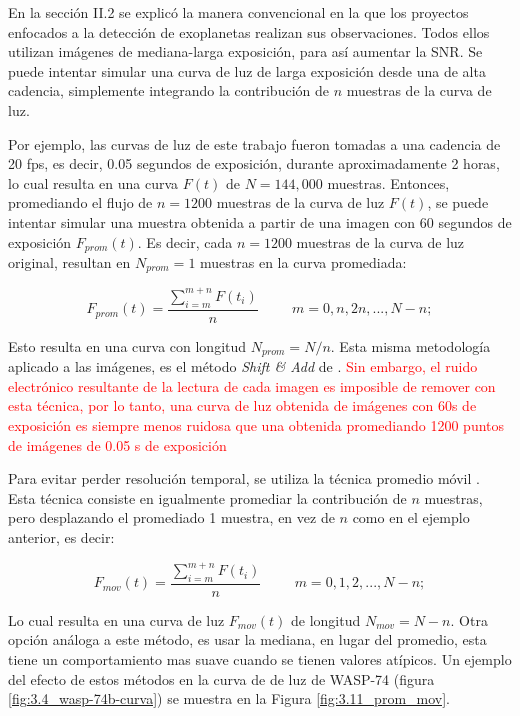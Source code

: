 En la sección II.2 se explicó la manera convencional en la que los proyectos enfocados a la detección de exoplanetas realizan sus observaciones. Todos ellos utilizan imágenes de mediana-larga exposición, para así aumentar la SNR. Se puede intentar simular una curva de luz de larga exposición desde una de alta cadencia, simplemente integrando la contribución de $n$ muestras de la curva de luz. 

Por ejemplo, las curvas de luz de este trabajo fueron tomadas a una cadencia de 20 fps, es decir, 0.05 segundos de exposición, durante aproximadamente 2 horas, lo cual resulta en una curva $F(t)$ de $N=144,000$ muestras. Entonces, promediando el flujo de $n=1200$ muestras de la curva de luz $F(t)$, se puede intentar simular una muestra obtenida a partir de una imagen con 60 segundos de exposición $F_{prom}(t)$. Es decir, cada $n=1200$ muestras de la curva de luz original, resultan en $N_{prom}=1$ muestras en la curva promediada:

\begin{equation}
  \displaystyle F_{prom}(t)=  \dfrac{\sum\limits_{i=m}^{m+n} F(t_{i})}{n}\hspace{1cm}m=0,n,2n,...,N-n;
\end{equation}

Esto resulta en una curva con longitud $N_{prom}=N/n$. Esta misma metodología aplicado a las imágenes, es el método \textit{Shift \& Add} de \cite{kluckers1996comparison}. \textcolor{red}{Sin embargo, el ruido electrónico resultante de la lectura de cada imagen es imposible de remover con esta técnica, por lo tanto, una curva de luz obtenida de imágenes con 60s de exposición es siempre menos ruidosa que una obtenida promediando 1200 puntos de imágenes de 0.05 s de exposición}

Para evitar perder resolución temporal, se utiliza la técnica promedio móvil \cite{borucki2009kepler}. Esta técnica consiste en igualmente promediar la contribución de $n$ muestras, pero desplazando el promediado 1 muestra, en vez de $n$ como en el ejemplo anterior, es decir:

\begin{equation}
  \displaystyle  F_{mov}(t)=  \dfrac{\sum\limits_{i=m}^{m+n} F(t_{i})}{n}\hspace{1cm}m=0,1,2,...,N-n;
\end{equation}

Lo cual resulta en una curva de luz $F_{mov}(t)$ de longitud  $N_{mov}=N-n$. Otra opción análoga a este método, es usar la mediana, en lugar del promedio, esta tiene un comportamiento mas suave cuando se tienen valores atípicos. Un ejemplo del efecto de estos métodos en la curva de de luz de WASP-74 (figura \ref{fig:3.4_wasp-74b-curva}) se muestra en la Figura \ref{fig:3.11_prom_mov}.

